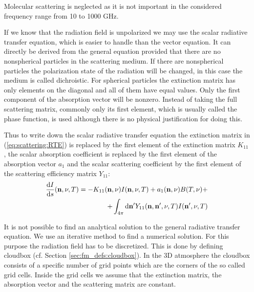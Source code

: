 Molecular scattering is neglected as it is not important in the 
considered frequency range from 10 to 1000 GHz. 

\label{sec:scattering:scalar_rte}

If we know that the radiation field is unpolarized we may use the scalar
radiative transfer equation, which is easier to handle than the vector
equation. It can directly be derived from the general equation
provided that there are no nonspherical particles in the scattering
medium. If there are nonspherical particles the polarization state of
the radiation will be changed, in this case the medium is called
dichroistic.
For spherical particles the extinction matrix has only elements on the
diagonal and all of them have equal values. Only the first component
of the absorption vector will be nonzero. Instead of taking the
full scattering 
matrix, commonly only its first element, which is usually called the
phase function, is used although there is no physical justification for
doing this.

Thus to write down the scalar radiative transfer equation the
extinction matrix in (\ref{eq:scattering:RTE}) is replaced by the
first element of the extinction matrix
$K_{11}$, the scalar absorption coefficient is replaced by the first
element of the absorption vector $a_1$ and the scalar scattering
coefficient by the first element of the scattering efficiency matrix
$Y_{11}$:
\begin{eqnarray}
  \label{eq:scattering:scalar_rte}
\frac{\mathrm{d} I}{\mathrm{d} s} ({\bf n}, \nu, T) = -K_{11}({\bf n}, \nu)I
({\bf n}, \nu, T) + a_1({\bf n}, \nu)B(T,\nu) + \\ \nonumber
 +\int_{4\pi} \mathrm{d} {\bf n}^\prime Y_{11}({\bf n}, {\bf n}^\prime, \nu, T) I({\bf n}^\prime,
  \nu, T)
\end{eqnarray}

\label{sec:scattering:solution_rte}

It is not possible to find an analytical solution to the general
radiative transfer equation. We use an iterative method to find a
numerical solution. For this purpose the radiation field has to be
discretized. This is done by defining cloudbox (cf. Section
\ref{sec:fm_defs:cloudbox}). In the 3D atmosphere the cloudbox
consists of a specific number of grid points which are the corners of
the so called grid cells. Inside the grid cells we assume that the
extinction matrix, the absorption vector and the scattering matrix are
constant. 

